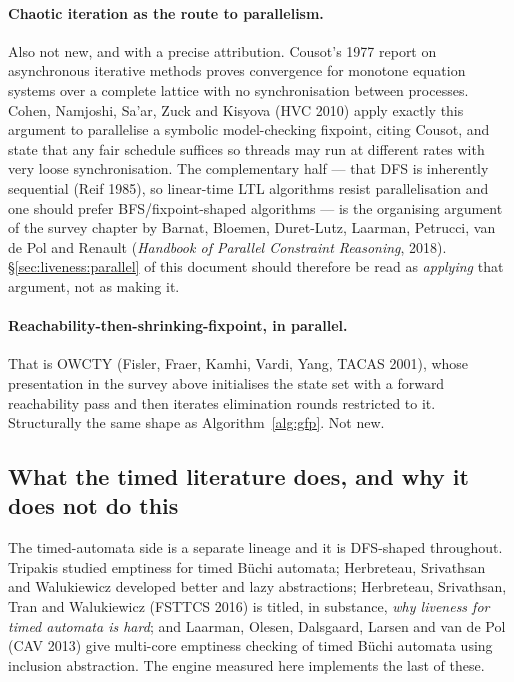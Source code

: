 \paragraph{Chaotic iteration as the route to parallelism.}
Also not new, and with a precise attribution. Cousot's 1977 report on asynchronous iterative methods
proves convergence for monotone equation systems over a complete lattice with no synchronisation
between processes. Cohen, Namjoshi, Sa'ar, Zuck and Kisyova (HVC 2010) apply exactly this argument
to parallelise a symbolic model-checking fixpoint, citing Cousot, and state that any fair schedule
suffices so threads may run at different rates with very loose synchronisation. The complementary
half --- that DFS is inherently sequential (Reif 1985), so linear-time LTL algorithms resist
parallelisation and one should prefer BFS/fixpoint-shaped algorithms --- is the organising argument
of the survey chapter by Barnat, Bloemen, Duret-Lutz, Laarman, Petrucci, van de Pol and Renault
(\emph{Handbook of Parallel Constraint Reasoning}, 2018). \S\ref{sec:liveness:parallel} of this
document should therefore be read as \emph{applying} that argument, not as making it.

\paragraph{Reachability-then-shrinking-fixpoint, in parallel.}
That is OWCTY (Fisler, Fraer, Kamhi, Vardi, Yang, TACAS 2001), whose presentation in the survey
above initialises the state set with a forward reachability pass and then iterates elimination
rounds restricted to it. Structurally the same shape as Algorithm~\ref{alg:gfp}. Not new.

\subsection{What the timed literature does, and why it does not do this}

The timed-automata side is a separate lineage and it is DFS-shaped throughout. Tripakis studied
emptiness for timed B\"uchi automata; Herbreteau, Srivathsan and Walukiewicz developed better and
lazy abstractions; Herbreteau, Srivathsan, Tran and Walukiewicz (FSTTCS 2016) is titled, in
substance, \emph{why liveness for timed automata is hard}; and Laarman, Olesen, Dalsgaard, Larsen
and van de Pol (CAV 2013) give multi-core emptiness checking of timed B\"uchi automata using
inclusion abstraction. The engine measured here implements the last of these.

